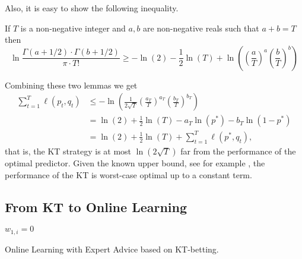 Also, it is easy to show the following inequality.
\begin{lemma}
\label{lemma:approx_gamma}
If $T$ is a non-negative integer and $a,b$ are non-negative reals such that $a +
b = T$ then
$$
\ln \frac{\Gamma(a + 1/2) \cdot \Gamma(b + 1/2)}{\pi \cdot T!} 
\geq -\ln(2) -\frac{1}{2} \ln(T) +\ln \left(\left( \frac{a}{T} \right)^a \left( \frac{b}{T} \right)^b\right) 
$$
\end{lemma}

Combining these two lemmas we get
\begin{align*}
\sum_{t=1}^T \ell(p_t, q_t)
& \le - \ln \left( \frac{1}{2\sqrt{T}} \left( \frac{a_T}{T} \right)^{a_T} \left( \frac{b_T}{T} \right)^{b_T} \right) \\
& = \ln(2) + \frac{1}{2} \ln(T) - a_T \ln (p^*) - b_T \ln (1-p^*) \\
& = \ln(2) + \frac{1}{2} \ln(T) + \sum_{t=1}^T \ell(p^*, q_t),
\end{align*}
that is, the \ac{KT} strategy is at most $\ln(2\sqrt{T})$ far from the performance of the optimal predictor. Given the known upper bound, see for example \citet{Cesa-BianchiL06}, the performance of the \ac{KT} is worst-case optimal up to a constant term.



\subsection{From KT to Online Learning}

\begin{algorithm}[t]
  \begin{algorithmic}
  {
     $w_{1,i}=0$
    \ENDFOR
  }
  \end{algorithmic}
  \caption{Online Learning with Expert Advice based on \ac{KT}-betting.}
  \label{algo:kt_expert}
\end{algorithm}

